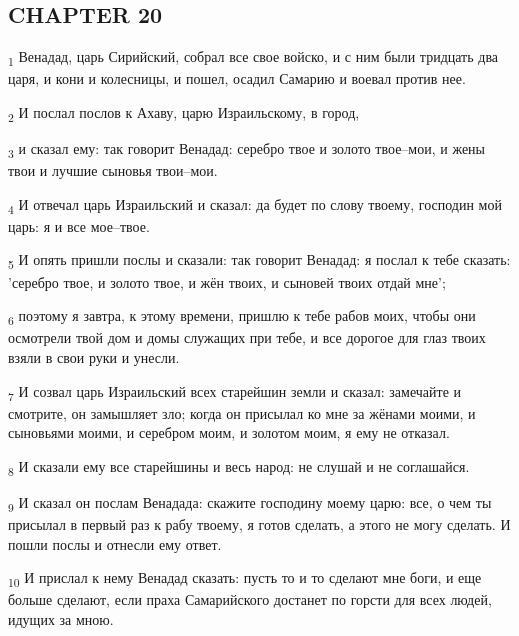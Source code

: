 \subsection{CHAPTER 20}
\begin{tcolorbox}
\textsubscript{1} Венадад, царь Сирийский, собрал все свое войско, и с ним были тридцать два царя, и кони и колесницы, и пошел, осадил Самарию и воевал против нее.
\end{tcolorbox}
\begin{tcolorbox}
\textsubscript{2} И послал послов к Ахаву, царю Израильскому, в город,
\end{tcolorbox}
\begin{tcolorbox}
\textsubscript{3} и сказал ему: так говорит Венадад: серебро твое и золото твое--мои, и жены твои и лучшие сыновья твои--мои.
\end{tcolorbox}
\begin{tcolorbox}
\textsubscript{4} И отвечал царь Израильский и сказал: да будет по слову твоему, господин мой царь: я и все мое--твое.
\end{tcolorbox}
\begin{tcolorbox}
\textsubscript{5} И опять пришли послы и сказали: так говорит Венадад: я послал к тебе сказать: 'серебро твое, и золото твое, и жён твоих, и сыновей твоих отдай мне';
\end{tcolorbox}
\begin{tcolorbox}
\textsubscript{6} поэтому я завтра, к этому времени, пришлю к тебе рабов моих, чтобы они осмотрели твой дом и домы служащих при тебе, и все дорогое для глаз твоих взяли в свои руки и унесли.
\end{tcolorbox}
\begin{tcolorbox}
\textsubscript{7} И созвал царь Израильский всех старейшин земли и сказал: замечайте и смотрите, он замышляет зло; когда он присылал ко мне за жёнами моими, и сыновьями моими, и серебром моим, и золотом моим, я ему не отказал.
\end{tcolorbox}
\begin{tcolorbox}
\textsubscript{8} И сказали ему все старейшины и весь народ: не слушай и не соглашайся.
\end{tcolorbox}
\begin{tcolorbox}
\textsubscript{9} И сказал он послам Венадада: скажите господину моему царю: все, о чем ты присылал в первый раз к рабу твоему, я готов сделать, а этого не могу сделать. И пошли послы и отнесли ему ответ.
\end{tcolorbox}
\begin{tcolorbox}
\textsubscript{10} И прислал к нему Венадад сказать: пусть то и то сделают мне боги, и еще больше сделают, если праха Самарийского достанет по горсти для всех людей, идущих за мною.
\end{tcolorbox}
